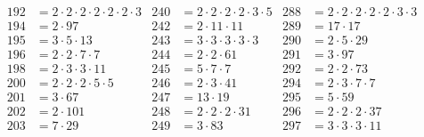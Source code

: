 \begin{align*}
  192&=2\cdot2\cdot2\cdot2\cdot2\cdot2\cdot3 & 240&=2\cdot2\cdot2\cdot2\cdot3\cdot5 & 288&=2\cdot2\cdot2\cdot2\cdot2\cdot3\cdot3       \\
  194&=2\cdot97                              & 242&=2\cdot11\cdot11                 & 289&=17\cdot17                                   \\
  195&=3\cdot5\cdot13                        & 243&=3\cdot3\cdot3\cdot3\cdot3       & 290&=2\cdot5\cdot29                              \\
  196&=2\cdot2\cdot7\cdot7                   & 244&=2\cdot2\cdot61                  & 291&=3\cdot97                                    \\
  198&=2\cdot3\cdot3\cdot11                  & 245&=5\cdot7\cdot7                   & 292&=2\cdot2\cdot73                              \\
  200&=2\cdot2\cdot2\cdot5\cdot5             & 246&=2\cdot3\cdot41                  & 294&=2\cdot3\cdot7\cdot7                         \\
  201&=3\cdot67                              & 247&=13\cdot19                       & 295&=5\cdot59                                    \\
  202&=2\cdot101                             & 248&=2\cdot2\cdot2\cdot31            & 296&=2\cdot2\cdot2\cdot37                        \\
  203&=7\cdot29                              & 249&=3\cdot83                        & 297&=3\cdot3\cdot3\cdot11                       
\end{align*}

